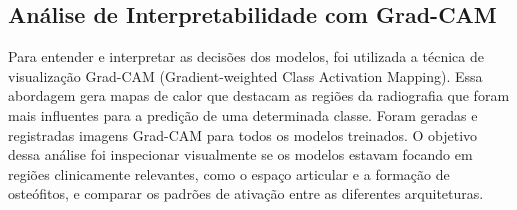 \subsection{Análise de Interpretabilidade com Grad-CAM}

Para entender e interpretar as decisões dos modelos, foi utilizada a técnica de visualização Grad-CAM (Gradient-weighted Class Activation Mapping). Essa abordagem gera mapas de calor que destacam as regiões da radiografia que foram mais influentes para a predição de uma determinada classe. Foram geradas e registradas imagens Grad-CAM para todos os modelos treinados. O objetivo dessa análise foi inspecionar visualmente se os modelos estavam focando em regiões clinicamente relevantes, como o espaço articular e a formação de osteófitos, e comparar os padrões de ativação entre as diferentes arquiteturas.